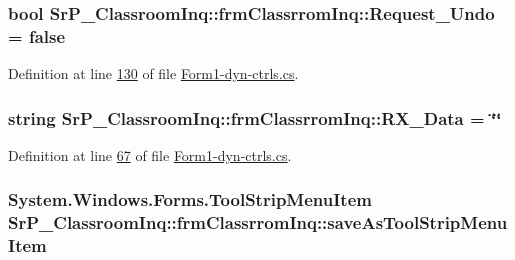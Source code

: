 \hypertarget{class_sr_p___classroom_inq_1_1frm_classrrom_inq_acb5bab8dcbcbfc8ed7a5b260ddba84e3}{
\subsubsection[{\-Request\-\_\-\-Undo}]{\setlength{\rightskip}{0pt plus 5cm}bool {\bf \-Sr\-P\-\_\-\-Classroom\-Inq\-::frm\-Classrrom\-Inq\-::\-Request\-\_\-\-Undo} = false}}
\label{class_sr_p___classroom_inq_1_1frm_classrrom_inq_acb5bab8dcbcbfc8ed7a5b260ddba84e3}


\-Definition at line \hyperlink{_form1-dyn-ctrls_8cs_source_l00130}{130} of file \hyperlink{_form1-dyn-ctrls_8cs_source}{\-Form1-\/dyn-\/ctrls.\-cs}.

\hypertarget{class_sr_p___classroom_inq_1_1frm_classrrom_inq_ab11c567168df8023b691c4adf4a149ad}{
\subsubsection[{\-R\-X\-\_\-\-Data}]{\setlength{\rightskip}{0pt plus 5cm}string {\bf \-Sr\-P\-\_\-\-Classroom\-Inq\-::frm\-Classrrom\-Inq\-::\-R\-X\-\_\-\-Data} = \char`\"{}\char`\"{}}}
\label{class_sr_p___classroom_inq_1_1frm_classrrom_inq_ab11c567168df8023b691c4adf4a149ad}


\-Definition at line \hyperlink{_form1-dyn-ctrls_8cs_source_l00067}{67} of file \hyperlink{_form1-dyn-ctrls_8cs_source}{\-Form1-\/dyn-\/ctrls.\-cs}.

\hypertarget{class_sr_p___classroom_inq_1_1frm_classrrom_inq_a660ffe654aa61a06b147d2220fc5c75d}{
\subsubsection[{save\-As\-Tool\-Strip\-Menu\-Item}]{\setlength{\rightskip}{0pt plus 5cm}\-System.\-Windows.\-Forms.\-Tool\-Strip\-Menu\-Item {\bf \-Sr\-P\-\_\-\-Classroom\-Inq\-::frm\-Classrrom\-Inq\-::save\-As\-Tool\-Strip\-Menu\-Item}}}
\label{class_sr_p___classroom_inq_1_1frm_classrrom_inq_a660ffe654aa61a06b147d2220fc5c75d}


